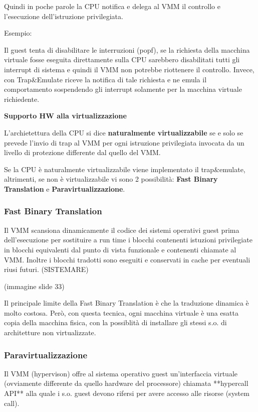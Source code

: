 \documentclass{article}
\begin{document}
Quindi in poche parole la CPU notifica e delega al VMM il controllo e l'esecuzione dell'istruzione privilegiata.

Esempio:

Il guest tenta di disabilitare le interruzioni (popf), se la richiesta della macchina virtuale fosse eseguita direttamente sulla CPU sarebbero disabilitati
tutti gli interrupt di sistema e quindi il VMM non potrebbe riottenere il controllo. Invece, con Trap\&Emulate riceve la notifica di tale richiesta e ne emula
il comportamento sospendendo gli interrupt solamente per la macchina virtuale richiedente.

\vspace{3mm}
\textbf{Supporto HW alla virtualizzazione}

L'archietettura della CPU si dice \textbf{naturalmente virtualizzabile} se e solo se prevede l'invio di trap al VMM per ogni istruzione privilegiata invocata da un
livello di protezione differente dal quello del VMM.

Se la CPU è naturalmente virtualizzabile viene implementato il trap\&emulate, altrimenti, se non è virtualizzabile vi sono 2 possibilità: \textbf{Fast Binary Translation} e 
\textbf{Paravirtualizzazione}.

\subsubsection{Fast Binary Translation}
Il VMM scansiona dinamicamente il codice dei sistemi operativi guest prima dell'esecuzione per sostituire a run time i blocchi contenenti istuzioni privilegiate
in blocchi equivalenti dal punto di vista funzionale e contenenti chiamate al VMM. Inoltre i blocchi tradotti sono eseguiti e conservati in cache per eventuali
riusi futuri. (SISTEMARE)

(immagine slide 33)

Il principale limite della Fast Binary Translation è che la traduzione dinamica è molto costosa. Però, con questa tecnica, ogni macchina virtuale è una esatta
copia della macchina fisica, con la possiblità di installare gli stessi s.o. di architetture non virtualizzate.

\subsubsection{Paravirtualizzazione}
Il VMM (hypervison) offre al sistema operativo guest un'interfaccia virtuale (ovviamente differente da quello hardware del processore) chiamata **hypercall API**
alla quale i s.o. guest devono rifersi per avere accesso alle risorse (system call).
\end{document}
